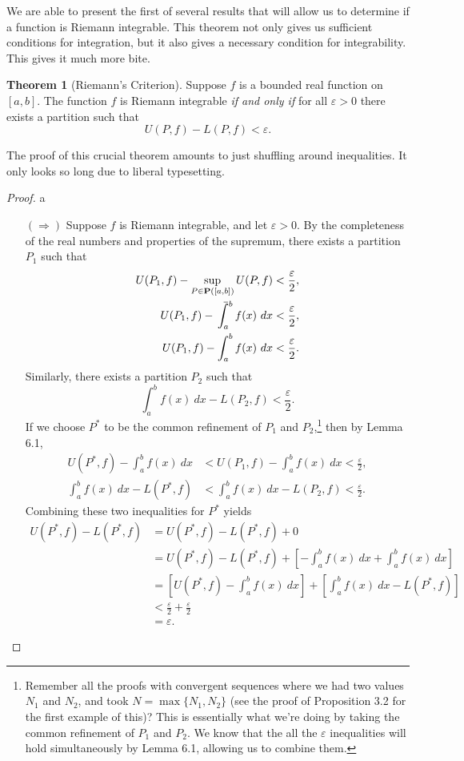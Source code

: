 \documentclass{article}
\def\upint{\mathchoice%
	{\mkern13mu\overline{\vphantom{\intop}\mkern7mu}\mkern-20mu}%
	{\mkern7mu\overline{\vphantom{\intop}\mkern7mu}\mkern-14mu}%
	{\mkern7mu\overline{\vphantom{\intop}\mkern7mu}\mkern-14mu}%
	{\mkern7mu\overline{\vphantom{\intop}\mkern7mu}\mkern-14mu}%
	\int}
\theoremstyle{definition}
\newtheorem{theorem}{Theorem}[section]
\begin{document}
	We are able to present the first of several results that will allow us to determine if a function is Riemann integrable. This theorem not only gives us sufficient conditions for integration, but it also gives a necessary condition for integrability. This gives it much more bite. 
	\begin{theorem}[Riemann's Criterion]
		Suppose $ f $ is a bounded real function on $ [a,b] $. The function $ f $ is Riemann integrable \textit{if and only if} for all $ \varepsilon>0 $ there exists a partition such that $$ U(P,f)-L(P,f)<\varepsilon.$$
	\end{theorem} The proof of this crucial theorem amounts to just shuffling around inequalities. It only looks so long due to liberal typesetting.  
	\begin{proof}{\color{white}a}
		\begin{enumerate}
			\item [$ (\Longrightarrow) $] Suppose $ f $ is Riemann integrable, and let $ \varepsilon>0 $. By the completeness of the real numbers and properties of the supremum, there exists a partition $ P_1 $ such that \begin{align*}
				U(P_1,f)-\sup\limits_{P\in\textbf{P}([a,b])}U(P,f)&<\frac{\varepsilon}{2},\\
				U(P_1,f)-\upint_a^b f(x)\ dx&<\frac{\varepsilon}{2},\\
				U(P_1,f)-\int_a^b f(x)\ dx&<\frac{\varepsilon}{2}.
			\end{align*} 
			Similarly, there exists a partition $ P_2 $ such that $$\int_a^bf(x)\ dx-L(P_2,f)<\frac{\varepsilon}{2}. $$ If we choose $ P^* $ to be the common refinement of $ P_1 $ and $ P_2 $,\footnote{Remember all the proofs with convergent sequences where we had two values $ N_1 $ and $ N_2 $, and took $ N=\max\{N_1,N_2\} $ (see the proof of Proposition 3.2 for the first example of this)? This is essentially what we're doing by taking the common refinement of $ P_1 $ and $ P_2 $. We know that the all the $ \varepsilon $ inequalities will hold simultaneously by Lemma 6.1, allowing us to combine them.} then by Lemma 6.1, \begin{align*}
				U(P^*,f)-\int_a^b f(x)\ dx&<U(P_1,f)-\int_a^b f(x)\ dx<\frac{\varepsilon}{2},\\\int_a^bf(x)\ dx-L(P^*,f)&<\int_a^bf(x)\ dx-L(P_2,f)<\frac{\varepsilon}{2}.
			\end{align*}
			Combining these two inequalities for $ P^* $ yields
			\begin{align*}
				U(P^*,f)-L(P^*,f)&=U(P^*,f)-L(P^*,f)+0\\&=U(P^*,f)-L(P^*,f)+\left[-\int_a^b f(x)\ dx+\int_a^bf(x)\ dx\right]\\&=\left[U(P^*,f)-\int_a^b f(x)\ dx\right]+\left[\int_a^bf(x)\ dx-L(P^*,f)\right]\\&<\frac{\varepsilon}{2}+\frac{\varepsilon}{2}\\&=\varepsilon.

\end{align*}
\end{enumerate}
\end{proof}
\end{document}
